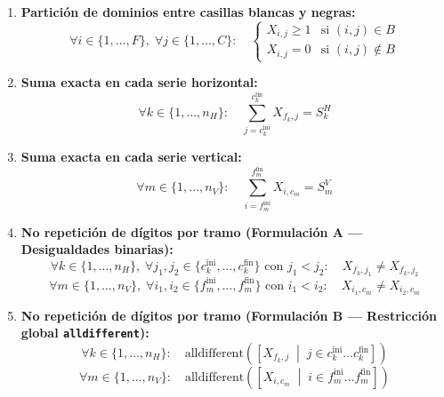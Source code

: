 \begin{enumerate}
    \item \textbf{ Partición de dominios entre casillas blancas y negras:}
    \[
        \forall i \in \{1, \dots, F\}, \; \forall j \in \{1, \dots, C\}: \quad
        \begin{cases}
            X_{i,j} \ge 1 & \text{si } (i, j) \in B \\
            X_{i,j} = 0   & \text{si } (i, j) \notin B
        \end{cases}
    \]

    \item \textbf{Suma exacta en cada serie horizontal:}
    \[
        \forall k \in \{1, \dots, n_H\}: \quad \sum_{j = c^{\text{ini}}_k}^{c^{\text{fin}}_k} X_{f_k, j} = S^H_k
    \]

    \item \textbf{Suma exacta en cada serie vertical:}
    \[
        \forall m \in \{1, \dots, n_V\}: \quad \sum_{i = f^{\text{ini}}_m}^{f^{\text{fin}}_m} X_{i, c_m} = S^V_m
    \]

    \item \textbf{No repetición de dígitos por tramo (Formulación A --- Desigualdades binarias):}
    \[
        \forall k \in \{1, \dots, n_H\}, \; \forall j_1, j_2 \in \{c^{\text{ini}}_k, \dots, c^{\text{fin}}_k\} \text{ con } j_1 < j_2: \quad X_{f_k, j_1} \neq X_{f_k, j_2}
    \]
    \[
        \forall m \in \{1, \dots, n_V\}, \; \forall i_1, i_2 \in \{f^{\text{ini}}_m, \dots, f^{\text{fin}}_m\} \text{ con } i_1 < i_2: \quad X_{i_1, c_m} \neq X_{i_2, c_m}
    \]

    \item \textbf{No repetición de dígitos por tramo (Formulación B --- Restricción global \texttt{alldifferent}):}
    \[
        \forall k \in \{1, \dots, n_H\}: \quad \text{alldifferent}\left(\left[ X_{f_k, j} \;\middle|\; j \in c^{\text{ini}}_k \dots c^{\text{fin}}_k \right]\right)
    \]
    \[
        \forall m \in \{1, \dots, n_V\}: \quad \text{alldifferent}\left(\left[ X_{i, c_m} \;\middle|\; i \in f^{\text{ini}}_m \dots f^{\text{fin}}_m \right]\right)
    \]
\end{enumerate}

